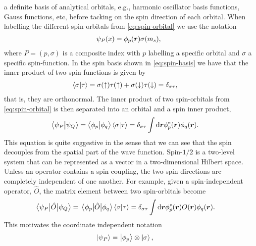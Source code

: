         a definite basis of analytical orbitals, e.g., harmonic oscillator basis
        functions, Gauss functions, etc, before tacking on the spin direction of
        each orbital.
        When labelling the different spin-orbitals from
        \autoref{eq:spin-orbital} we use the notation
        \begin{align}
            \psi_P(x) = \phi_p(\boldsymbol{r})\sigma(m_s),
        \end{align}
        where $P = (p, \sigma)$ is a composite index with $p$ labelling a
        specific orbital and $\sigma$ a specific spin-function.
        In the spin basis shown in \autoref{eq:spin-basis} we have that the
        inner product of two spin functions is given by
        \begin{align}
            \braket{\sigma}{\tau}
            &=
            \sigma(\uparrow)\tau(\uparrow)
            + \sigma(\downarrow)\tau(\downarrow)
            = \delta_{\sigma\tau},
        \end{align}
        that is, they are orthonormal.
        The inner product of two spin-orbitals from \autoref{eq:spin-orbital} is
        then separated into an orbital and a spin inner product,
        \begin{align}
            \braket{\psi_P}{\psi_Q}
            &= \braket{\phi_p}{\phi_q}\braket{\sigma}{\tau}
            = \delta_{\sigma\tau}
            \int\dd\boldsymbol{r}\phi^{*}_{p}(\boldsymbol{r})\phi_{q}(\boldsymbol{r}).
            \label{eq:inner-spin-orbital}
        \end{align}
        This equation is quite suggestive in the sense that we can see that the
        spin decouples from the spatial part of the wave function.
        Spin-$1/2$ is a two-level system that can be represented as a vector
        in a two-dimensional Hilbert space.
        Unless an operator contains a spin-coupling, the two spin-directions are
        completely independent of one another.
        For example, given a spin-independent operator, $\hat{O}$, the
        matrix element between two spin-orbitals become
        \begin{align}
            \mel{\psi_P}{\hat{O}}{\psi_Q}
            &= \mel{\phi_p}{\hat{O}}{\phi_q}\braket{\sigma}{\tau}
            = \delta_{\sigma\tau}
            \int\dd\boldsymbol{r}\phi^{*}_{p}(\boldsymbol{r})O(\boldsymbol{r})\phi_q(\boldsymbol{r}).
            \label{eq:example-spin-decoupling}
        \end{align}
        This motivates the coordinate independent notation
        \begin{align}
            \ket{\psi_P}
            &= \ket{\phi_p}\otimes\ket{\sigma},
        \end{align}
